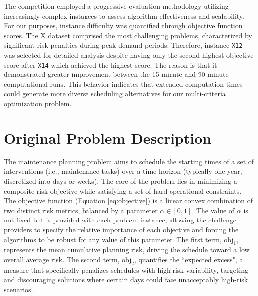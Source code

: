 The competition employed a progressive evaluation methodology utilizing increasingly complex instances to assess algorithm effectiveness and scalability. For our purposes, instance difficulty was quantified through objective function scores. The X dataset comprised the most challenging problems, characterized by significant risk penalties during peak demand periods. Therefore, instance \texttt{X12} was selected for detailed analysis despite having only the second-highest objective score after \texttt{X14} which achieved the highest score. The reason is that it demonstrated greater improvement between the 15-minute and 90-minute computational runs. This behavior indicates that extended computation times could generate more diverse scheduling alternatives for our multi-criteria optimization problem.


\section{Original Problem Description}

The maintenance planning problem aims to schedule the starting times of a set of interventions (i.e., maintenance tasks) over a time horizon (typically one year, discretized into days or weeks). The core of the problem lies in minimizing a composite risk objective while satisfying a set of hard operational constraints.\\

The objective function (Equation \ref{eq:objective}) is a linear convex combination of two distinct risk metrics, balanced by a parameter $\alpha \in [0,1]$. The value of $\alpha$ is not fixed but is provided with each problem instance, allowing the challenge providers to specify the relative importance of each objective and forcing the algorithms to be robust for any value of this parameter. The first term, $\mathrm{obj}_1$, represents the mean cumulative planning risk, driving the schedule toward a low overall average risk. The second term, $\mathrm{obj}_2$, quantifies the ``expected excess", a measure that specifically penalizes schedules with high-risk variability, targeting and discouraging solutions where certain days could face unacceptably high-risk scenarios.\\

